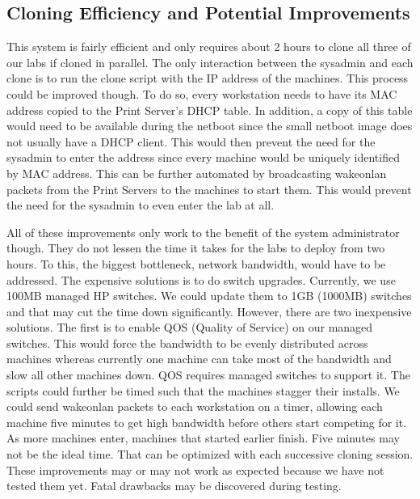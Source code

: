 \subsection{Cloning Efficiency and Potential Improvements}
This system is fairly efficient and only requires about 2 hours to clone all three of our labs if cloned in parallel.  The only interaction between the sysadmin and each clone is to run the clone script with the IP address of the machines.  This process could be improved though.  To do so, every workstation needs to have its MAC address copied to the Print Server's DHCP table.  In addition, a copy of this table would need to be available during the netboot since the small netboot image does not usually have a DHCP client.  This would then prevent the need for the sysadmin to enter the address since every machine would be uniquely identified by MAC address.  This can be further automated by broadcasting wakeonlan packets from the Print Servers to the machines to start them.  This would prevent the need for the sysadmin to even enter the lab at all.  

All of these improvements only work to the benefit of the system administrator though.  They do not lessen the time it takes for the labs to deploy from two hours.  To this, the biggest bottleneck, network bandwidth, would have to be addressed.  The expensive solutions is to do switch upgrades.  Currently, we use 100MB managed HP switches.  We could update them to 1GB (1000MB) switches and that may cut the time down significantly.  However, there are two inexpensive solutions.  The first is to enable QOS (Quality of Service) on our managed switches.  This would force the bandwidth to be evenly distributed across machines whereas currently one machine can take most of the bandwidth and slow all other machines down.  QOS requires managed switches to support it.   The scripts could further be timed such that the machines stagger their installs.  We could send wakeonlan packets to each workstation on a timer, allowing each machine five minutes to get high bandwidth before others start competing for it.  As more machines enter, machines that started earlier finish.  Five minutes may not be the ideal time.  That can be optimized with each successive cloning session.  These improvements may or may not work as expected because we have not tested them yet.  Fatal drawbacks may be discovered during testing.  


